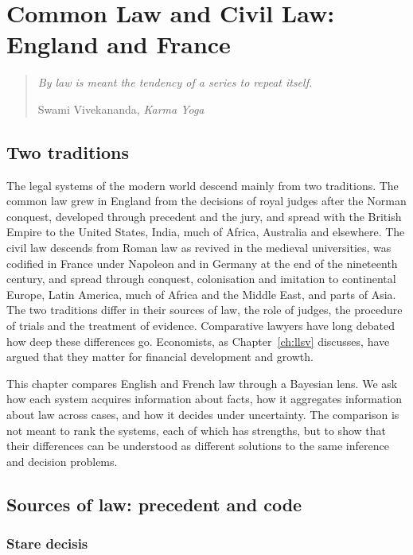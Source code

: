 \chapter{Common Law and Civil Law: England and France}
\label{ch:commoncivil}

\begin{quote}\itshape
By law is meant the tendency of a series to repeat itself.
\par\hfill\normalfont Swami Vivekananda, \emph{Karma Yoga}
\end{quote}

\section{Two traditions}

The legal systems of the modern world descend mainly from two traditions. The common law grew in England from the decisions of royal judges after the Norman conquest, developed through precedent and the jury, and spread with the British Empire to the United States, India, much of Africa, Australia and elsewhere. The civil law descends from Roman law as revived in the medieval universities, was codified in France under Napoleon and in Germany at the end of the nineteenth century, and spread through conquest, colonisation and imitation to continental Europe, Latin America, much of Africa and the Middle East, and parts of Asia. The two traditions differ in their sources of law, the role of judges, the procedure of trials and the treatment of evidence. Comparative lawyers have long debated how deep these differences go. Economists, as Chapter~\ref{ch:llsv} discusses, have argued that they matter for financial development and growth.

This chapter compares English and French law through a Bayesian lens. We ask how each system acquires information about facts, how it aggregates information about law across cases, and how it decides under uncertainty. The comparison is not meant to rank the systems, each of which has strengths, but to show that their differences can be understood as different solutions to the same inference and decision problems.

\section{Sources of law: precedent and code}

\subsection{Stare decisis}

